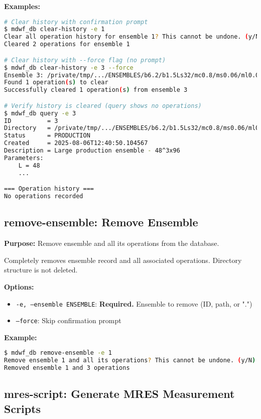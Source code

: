 \documentclass{article}
\begin{document}
\textbf{Examples:}
\begin{lstlisting}[language=bash]
# Clear history with confirmation prompt
$ mdwf_db clear-history -e 1
Clear all operation history for ensemble 1? This cannot be undone. (y/N) y
Cleared 2 operations for ensemble 1

# Clear history with --force flag (no prompt)
$ mdwf_db clear-history -e 3 --force
Ensemble 3: /private/tmp/.../ENSEMBLES/b6.2/b1.5Ls32/mc0.8/ms0.06/ml0.015/L48/T96
Found 1 operation(s) to clear
Successfully cleared 1 operation(s) from ensemble 3

# Verify history is cleared (query shows no operations)
$ mdwf_db query -e 3
ID          = 3
Directory   = /private/tmp/.../ENSEMBLES/b6.2/b1.5Ls32/mc0.8/ms0.06/ml0.015/L48/T96
Status      = PRODUCTION
Created     = 2025-08-06T12:40:50.104567
Description = Large production ensemble - 48^3x96
Parameters:
    L = 48
    ...

=== Operation history ===
No operations recorded
\end{lstlisting}

\subsection{remove-ensemble: Remove Ensemble}

\textbf{Purpose:} Remove ensemble and all its operations from the database.

Completely removes ensemble record and all associated operations. Directory structure is not deleted.

\textbf{Options:}
\begin{itemize}
\item \texttt{-e, --ensemble ENSEMBLE}: \textbf{Required.} Ensemble to remove (ID, path, or ".")
\item \texttt{--force}: Skip confirmation prompt
\end{itemize}

\textbf{Example:}
\begin{lstlisting}[language=bash]
$ mdwf_db remove-ensemble -e 1
Remove ensemble 1 and all its operations? This cannot be undone. (y/N) y
Removed ensemble 1 and 3 operations
\end{lstlisting}

\subsection{mres-script: Generate MRES Measurement Scripts}
\end{document}

